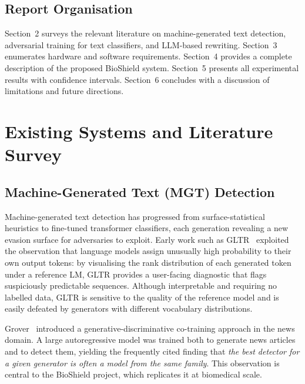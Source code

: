 \documentclass[12pt,a4paper]{article}
\begin{document}
\subsection{Report Organisation}

Section~2 surveys the relevant literature on machine-generated text
detection, adversarial training for text classifiers, and LLM-based
rewriting. Section~3 enumerates hardware and software requirements.
Section~4 provides a complete description of the proposed BioShield system.
Section~5 presents all experimental results with confidence intervals.
Section~6 concludes with a discussion of limitations and future directions.

\newpage
\section{Existing Systems and Literature Survey}
\label{sec:literature}

\subsection{Machine-Generated Text (MGT) Detection}

Machine-generated text detection has progressed from surface-statistical
heuristics to fine-tuned transformer classifiers, each generation revealing
a new evasion surface for adversaries to exploit.
Early work such as GLTR~\cite{gehrmann2019gltr} exploited the observation
that language models assign unusually high probability to their own output
tokens: by visualising the rank distribution of each generated token under a
reference LM, GLTR provides a user-facing diagnostic that flags
suspiciously predictable sequences. Although interpretable and requiring no
labelled data, GLTR is sensitive to the quality of the reference model and
is easily defeated by generators with different vocabulary distributions.

Grover~\cite{zellers2019defending} introduced a generative-discriminative
co-training approach in the news domain. A large autoregressive model was
trained both to generate news articles and to detect them, yielding the
frequently cited finding that \emph{the best detector for a given generator
is often a model from the same family}. This observation is central to the
BioShield project, which replicates it at biomedical scale.
\end{document}
